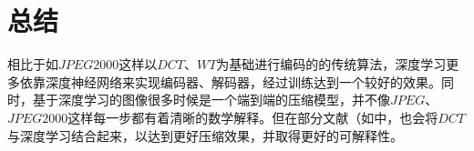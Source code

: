 \documentclass[UTF8]{ctexart}
\begin{document}
%
%
%
%
%
%
%
                

        

            


	\section{总结}
        
        \indent 相比于如$JPEG2000$这样以$DCT$、$WT$为基础进行编码的的传统算法，深度学习更多依靠深度神经网络来实现编码器、解码器，经过训练达到一个较好的效果。同时，基于深度学习的图像很多时候是一个端到端的压缩模型，并不像$JPEG$、$JPEG2000$这样每一步都有着清晰的数学解释。但在部分文献（如\cite{Fu_2019_ICCV}中，也会将$DCT$与深度学习结合起来，以达到更好压缩效果，并取得更好的可解释性。
		

		
	
	
%
%

\end{document}
